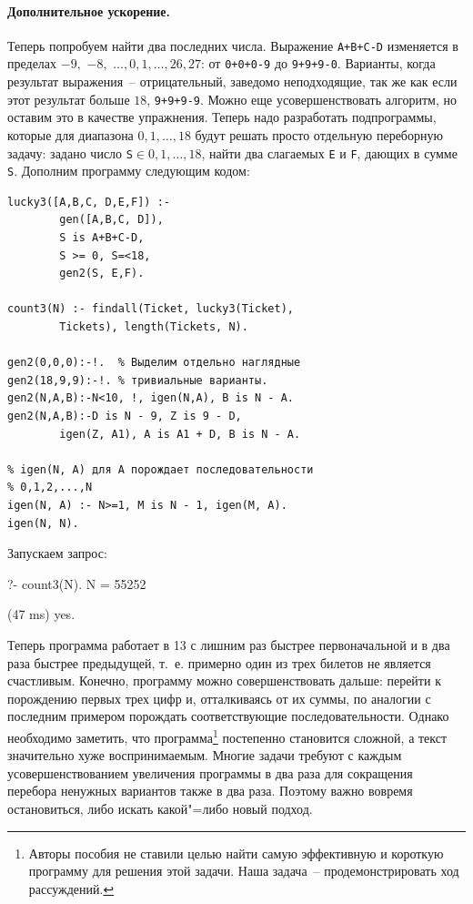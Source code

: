 \documentclass[a4paper,14pt, openany, twoside, draft]{extbook} %
\begin{document}
\paragraph{Дополнительное ускорение.} Теперь попробуем найти два последних числа. Выражение \texttt{A+B+C-D} изменяется в пределах $-9,$ $-8,$ $\ldots,0,1,\ldots,26,27$: от \texttt{0+0+0-9} до \texttt{9+9+9-0}. Варианты, когда результат выражения~-- отрицательный, заведомо неподходящие, так же как если этот результат больше $18$, \texttt{9+9+9-9}. Можно еще усовершенствовать алгоритм, но оставим это в качестве упражнения. Теперь надо разработать подпрограммы, которые для диапазона $0,1,\ldots,18$ будут решать просто отдельную переборную задачу: задано число \texttt{S}$\in 0,1,\ldots,18$, найти два слагаемых \texttt{E} и \texttt{F}, дающих в сумме \texttt{S}. Дополним программу следующим кодом:

\begin{verbatim}
lucky3([A,B,C, D,E,F]) :-
        gen([A,B,C, D]),
        S is A+B+C-D,
        S >= 0, S=<18,
        gen2(S, E,F).

count3(N) :- findall(Ticket, lucky3(Ticket),
        Tickets), length(Tickets, N).

gen2(0,0,0):-!.  % Выделим отдельно наглядные
gen2(18,9,9):-!. % тривиальные варианты.
gen2(N,A,B):-N<10, !, igen(N,A), B is N - A.
gen2(N,A,B):-D is N - 9, Z is 9 - D,
        igen(Z, A1), A is A1 + D, B is N - A.

% igen(N, A) для A порождает последовательности
% 0,1,2,...,N
igen(N, A) :- N>=1, M is N - 1, igen(M, A).
igen(N, N).
\end{verbatim}

\noindent{}Запускаем запрос:

\begin{proexp}
?- count3(N).
N = 55252

(47 ms) yes.
\end{proexp}


Теперь программа работает в 13 с лишним раз быстрее первоначальной и в два раза быстрее предыдущей, т.~е. примерно один из трех билетов не является счастливым. Конечно, программу можно совершенствовать дальше: перейти к порождению первых трех цифр и, отталкиваясь от их суммы, по аналогии с последним примером порождать соответствующие последовательности. Однако необходимо заметить, что программа\footnote{Авторы пособия не ставили целью найти самую эффективную и короткую программу для решения этой задачи. Наша задача~-- продемонстрировать ход рассуждений.} постепенно становится сложной, а текст значительно хуже воспринимаемым. Многие задачи требуют с каждым усовершенствованием увеличения программы в два раза для сокращения перебора ненужных вариантов также в два раза. Поэтому важно вовремя остановиться, либо искать какой"=либо новый подход.
\end{document}
